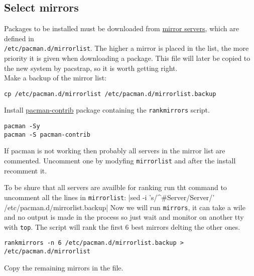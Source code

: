 \documentclass[12pt,A4]{article}
\begin{document}
\subsection{Select mirrors}
Packages to be installed must be downloaded from \href{https://wiki.archlinux.org/index.php/Mirrors}{mirror servers}, which are defined in \\ \texttt{/etc/pacman.d/mirrorlist}. The higher a mirror is placed in the list, the more priority it is given when downloading a package. This file will later be copied to the new system by pacstrap, so it is worth getting right.\\
Make a backup of the mirror list:
\begin{verbatim}
cp /etc/pacman.d/mirrorlist /etc/pacman.d/mirrorlist.backup
\end{verbatim}
Install \href{https://git.archlinux.org/pacman-contrib.git/about/}{pacman-contrib} package containing the \texttt{rankmirrors} script.
\begin{verbatim}
pacman -Sy
pacman -S pacman-contrib
\end{verbatim}
\begin{tcolorbox}[colback=ArchGreen,sharp corners,boxrule=0.2mm]
If pacman is not working then probably all servers in the mirror list are commented. Uncomment one by modyfing \texttt{mirrorlist} and after the install recomment it.
\end{tcolorbox}
\noindent To be shure that all servers are availble for ranking run tht command to uncomment all the lines in \texttt{mirrorlist}:
|sed -i 's/^#Server/Server/' /etc/pacman.d/mirrorlist.backup|
Now we will run \texttt{mirrors}, it can take a wile and no output is made in the process so just wait and monitor on another tty with \texttt{top}. The script will rank the first 6 best mirrors delting the other ones.
\begin{verbatim}
rankmirrors -n 6 /etc/pacman.d/mirrorlist.backup > /etc/pacman.d/mirrorlist
\end{verbatim}
Copy the remaining mirrors in the file.
\end{document}
